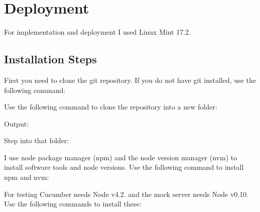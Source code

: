 \chapter{Deployment}\label{deployment}

For implementation and deployment I used Linux Mint 17.2.

\section{Installation Steps}

First you need to clone the git repository. If you do not have git installed, use the following command:


Use the following command to clone the repository into a new folder:


Output:

	
Step into that folder:


I use node package manager (npm) and the node version manager (nvm) to install software tools and node versions. Use the following command to install npm and nvm:


For testing Cucumber needs Node v4.2. and the mock server needs Node v0.10. Use the following commands to install these:

	
